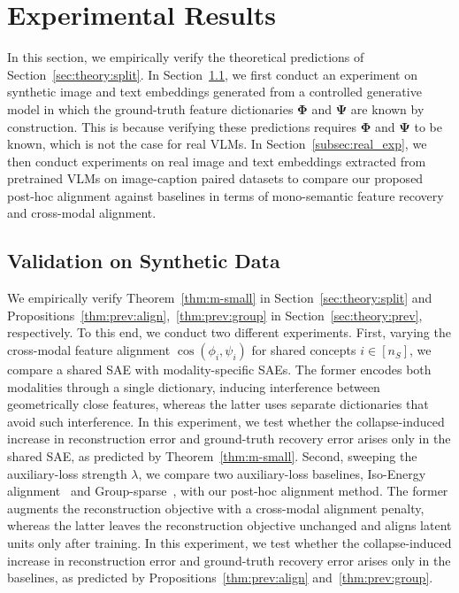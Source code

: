 \section{Experimental Results}
\label{sec:experiments}

In this section, we empirically verify the theoretical predictions of Section~\ref{sec:theory:split}.
In Section~\ref{subsec:synthetic_exp}, we first conduct an experiment on synthetic image and text embeddings generated from a controlled generative model in which the ground-truth feature dictionaries $\boldsymbol\Phi$ and $\boldsymbol\Psi$ are known by construction.
This is because verifying these predictions requires $\boldsymbol\Phi$ and $\boldsymbol\Psi$ to be known, which is not the case for real VLMs.
In Section~\ref{subsec:real_exp}, we then conduct experiments on real image and text embeddings extracted from pretrained VLMs on image-caption paired datasets to compare our proposed post-hoc alignment against baselines in terms of mono-semantic feature recovery and cross-modal alignment.


\subsection{Validation on Synthetic Data}
\label{subsec:synthetic_exp}

We empirically verify Theorem~\ref{thm:m-small} in Section~\ref{sec:theory:split} and Propositions~\ref{thm:prev:align},~\ref{thm:prev:group} in Section~\ref{sec:theory:prev}, respectively. To this end, we conduct two different experiments.
First, varying the cross-modal feature alignment $\cos(\phi_i, \psi_i)$ for shared concepts $i \in [n_S]$, we compare a shared SAE with modality-specific SAEs. The former encodes both modalities through a single dictionary, inducing interference between geometrically close features, whereas the latter uses separate dictionaries that avoid such interference. In this experiment, we test whether the collapse-induced increase in reconstruction error and ground-truth recovery error arises only in the shared SAE, as predicted by Theorem~\ref{thm:m-small}.
Second, sweeping the auxiliary-loss strength $\lambda$, we compare two auxiliary-loss baselines, Iso-Energy alignment~\citep{dhimoila2026crossmodal} and Group-sparse~\citep{kaushik2026learning}, with our post-hoc alignment method. The former augments the reconstruction objective with a cross-modal alignment penalty, whereas the latter leaves the reconstruction objective unchanged and aligns latent units only after training. In this experiment, we test whether the collapse-induced increase in reconstruction error and ground-truth recovery error arises only in the baselines, as predicted by Propositions~\ref{thm:prev:align} and~\ref{thm:prev:group}.

